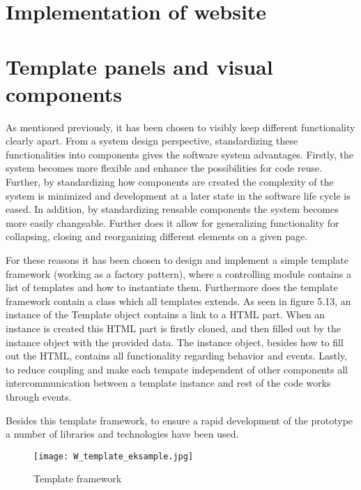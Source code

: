 \section{Implementation of website}
\section*{Template panels and visual components}
As mentioned previously, it has been chosen to visibly keep different functionality clearly apart. From a system design perspective, standardizing these functionalities into components gives the software system advantages. Firstly, the system becomes more flexible and enhance the possibilities for code reuse. Further, by standardizing how components are created the complexity of the system is minimized and development at a later state in the software life cycle is eased. In addition, by standardizing reusable components the system becomes more easily changeable. Further does it allow for generalizing functionality for collapsing, closing and reorganizing different elements on a given page.  

For these reasons it has been chosen to design and implement a simple template framework (working as a factory pattern), where a controlling module contains a list of templates and how to instantiate them. Furthermore does the template framework contain a class which all templates extends. As seen in figure 5.13, an instance of the Template object contains a link to a HTML part. When an instance is created this HTML part is firstly cloned, and then filled out by the instance object with the provided data. The instance object, besides how to fill out the HTML, contains all functionality regarding behavior and events. Lastly, to reduce coupling and make each tempate independent of other components all intercommunication between a template instance and rest of the code works through events.

Besides this template framework, to ensure a rapid development of the prototype a number of libraries and technologies have been used.
\begin{figure}
\begin{center}
\texttt{[image: W\_template\_eksample.jpg]}
\end{center}
\caption{Template framework}
\end{figure}
